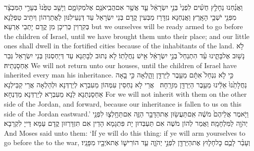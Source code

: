 {וַאֲנַ֜חְנוּ נֵחָלֵ֣ץ חֻשִׁ֗ים לִפְנֵי֙ בְּנֵ֣י יִשְׂרָאֵ֔ל עַ֛ד אֲשֶׁ֥ר אִם\maqqaf הֲבִֽיאֹנֻ֖ם אֶל\maqqaf מְקוֹמָ֑ם וְיָשַׁ֤ב טַפֵּ֙נוּ֙ בְּעָרֵ֣י הַמִּבְצָ֔ר מִפְּנֵ֖י יֹשְׁבֵ֥י הָאָֽרֶץ׃}
{וַאֲנַחְנָא נִזְדָּרַז מַבְּעִין קֳדָם בְּנֵי יִשְׂרָאֵל עַד דְּנַעֵילִנּוּן לַאֲתַרְהוֹן וְיִתֵּיב טַפְלַנָא בְּקִרְוִין כְּרִיכָן מִן קֳדָם יָתְבֵי אַרְעָא׃}
{but we ourselves will be ready armed to go before the children of Israel, until we have brought them unto their place; and our little ones shall dwell in the fortified cities because of the inhabitants of the land.}{}
{לֹ֥א נָשׁ֖וּב אֶל\maqqaf בָּתֵּ֑ינוּ עַ֗ד הִתְנַחֵל֙ בְּנֵ֣י יִשְׂרָאֵ֔ל אִ֖ישׁ נַחֲלָתֽוֹ׃}
{לָא נְתוּב לְבָתַּנָא עַד דְּיַחְסְנוּן בְּנֵי יִשְׂרָאֵל גְּבַר אַחְסָנְתֵיהּ׃}
{We will not return unto our houses, until the children of Israel have inherited every man his inheritance.}{}
{כִּ֣י לֹ֤א נִנְחַל֙ אִתָּ֔ם מֵעֵ֥בֶר לַיַּרְדֵּ֖ן וָהָ֑לְאָה כִּ֣י בָ֤אָה נַחֲלָתֵ֙נוּ֙ אֵלֵ֔ינוּ מֵעֵ֥בֶר הַיַּרְדֵּ֖ן מִזְרָֽחָה׃ \petucha }
{אֲרֵי לָא נַחְסֵין עִמְּהוֹן מֵעִבְרָא לְיַרְדְּנָא וּלְהַלְאָה אֲרֵי קַבֵּילְנָא אַחְסָנְתַנָא לַנָא מֵעִבְרָא לְיַרְדְּנָא מַדְנְחָא׃}
{For we will not inherit with them on the other side of the Jordan, and forward, because our inheritance is fallen to us on this side of the Jordan eastward.’}{}
{וַיֹּ֤אמֶר אֲלֵיהֶם֙ מֹשֶׁ֔ה אִֽם\maqqaf תַּעֲשׂ֖וּן אֶת\maqqaf הַדָּבָ֣ר הַזֶּ֑ה אִם\maqqaf תֵּחָ֥לְצ֛וּ לִפְנֵ֥י יְהֹוָ֖ה לַמִּלְחָמָֽה׃}
{וַאֲמַר לְהוֹן מֹשֶׁה אִם תַּעְבְּדוּן יָת פִּתְגָמָא הָדֵין אִם תִּזְדָּרְזוּן קֳדָם עַמָּא דַּייָ לִקְרָבָא׃}
{And Moses said unto them: ‘If ye will do this thing: if ye will arm yourselves to go before the \lord\space to the war,}{}
{וְעָבַ֨ר לָכֶ֧ם כׇּל\maqqaf חָל֛וּץ אֶת\maqqaf הַיַּרְדֵּ֖ן לִפְנֵ֣י יְהֹוָ֑ה עַ֧ד הוֹרִישׁ֛וֹ אֶת\maqqaf אֹיְבָ֖יו מִפָּנָֽיו׃}

